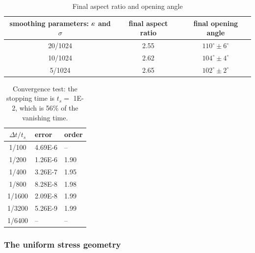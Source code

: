 \documentclass[preprint, 10pt]{elsarticle}
\begin{document}
\begin{table}[p]%
\begin{center}
\caption{Final aspect ratio and opening angle
} 
\vspace{0.3 pc}
\begin{tabular}{c c c}
\hline
\hspace{0.5pc} smoothing parameters: $\varepsilon$ and $\sigma$
\hspace{0.5pc} & final aspect ratio 
\hspace{0.5pc} & final opening angle \\
\hline
20/1024		& 2.55	& $110^\circ \pm 6^\circ$	\\
10/1024		& 2.62	& $104^\circ \pm 4^\circ$	\\
5/1024		& 2.65	& $102^\circ \pm 2^\circ$	\\
\hline
\end{tabular}
\end{center}
\end{table}

\begin{table}%
\begin{center}
\caption{Convergence test: the stopping time is $t_s =$ 1E-2, which is 56\% of the vanishing time.
} 
\vspace{0.3 pc}
\label{convtab}
\begin{tabular}{c l l}
\hline
\hspace{0.5pc} $\Delta t/t_s$
\hspace{0.5pc} & error 
\hspace{0.5pc} & order \\
\hline
1/100	& 4.69E-6		& --		\\
1/200	& 1.26E-6		& 1.90	\\
1/400	& 3.26E-7		& 1.95	\\
1/800	& 8.28E-8		& 1.98	\\
1/1600	& 2.09E-8		& 1.99	\\
1/3200	& 5.26E-9		& 1.99	\\
1/6400	& --			& --		\\
\hline
\end{tabular}
\end{center}
\end{table}



\subsubsection{The uniform stress geometry}
\end{document}
